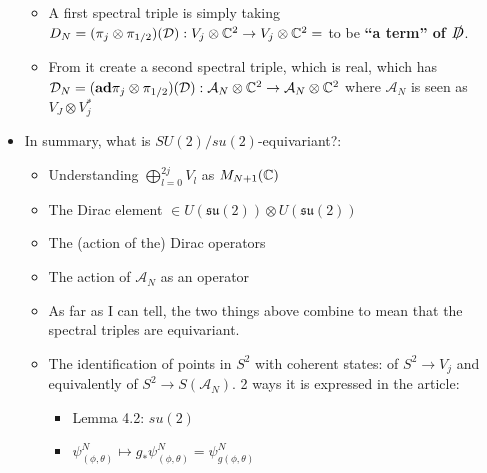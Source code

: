 \documentclass{article}
\newcommand{\sut}{\ensuremath{\mathfrak{su}(2)}}
\begin{document}
\begin{itemize}
\begin{itemize}
\begin{itemize}
                \end{itemize}
            
            \item A first spectral triple is simply taking $D_N = (\pi_j \otimes \pi_{1/2})(\mathcal D): V_j \otimes \mathbb{C}^2 \to V_j \otimes \mathbb{C}^2 = $ to be \textbf{``a term'' of $\slashed D$}.
            
            \item From it create a second spectral triple, which is real, which has $\mathcal D_N = (\textbf{ad}\pi_j \otimes \pi_{1/2})(\mathcal D): \mathcal A_N \otimes \mathbb{C}^2 \to \mathcal A_N \otimes \mathbb{C}^2$ where $\mathcal A_N$ is seen as $V_J \otimes V_j^*$
            
        \end{itemize}
    
    \item In summary, what is $SU(2)/su(2)$-equivariant?:
    
        \begin{itemize}
            
        \item Understanding $\bigoplus_{l = 0}^{2j} V_l$ as $M_{N+1}(\mathbb{C})$
        
        \item The Dirac element $\in U(\sut) \otimes U(\sut)$
        
        \item The (action of the) Dirac operators
        
        \item The action of $\mathcal A_N$ as an operator

        \item As far as I can tell, the two things above combine to mean that the spectral triples are equivariant.
        
        \item The identification of points in $S^2$ with coherent states: of $S^2 \to V_j$ and equivalently of $S^2 \to S(\mathcal A_N)$. 2 ways it is expressed in the article:
        
            \begin{itemize}
                
            \item Lemma 4.2: $su(2)$
            
            \item $\psi^N_{(\phi, \theta)} \mapsto g_* \psi^N_{(\phi, \theta)} = \psi^N_{g(\phi, \theta)}$    
            

\end{itemize}
\end{itemize}
\end{itemize}
\end{document}

